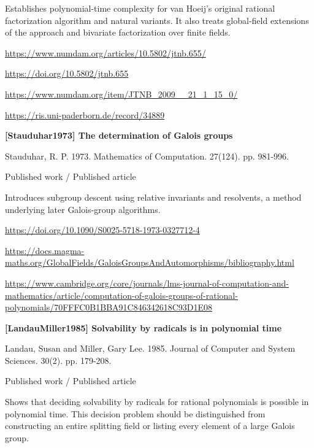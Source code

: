 \documentclass[11pt,a4paper,oneside,openany]{book}
\begin{document}
\color{black} Establishes polynomial-time complexity for van Hoeij's original rational factorization algorithm and natural variants. It also treats global-field extensions of the approach and bivariate factorization over finite fields.\par
{\footnotesize\url{https://www.numdam.org/articles/10.5802/jtnb.655/}}\par
{\footnotesize\url{https://doi.org/10.5802/jtnb.655}}\par
{\footnotesize\url{https://www.numdam.org/item/JTNB_2009__21_1_15_0/}}\par
{\footnotesize\url{https://ris.uni-paderborn.de/record/34889}}\par
\vspace{9pt}
\hypertarget{ref:Stauduhar1973}{}
{\sffamily\bfseries\color{atlasgreen}[Stauduhar1973] The determination of Galois groups}\par
\color{black} Stauduhar, R. P. 1973. Mathematics of Computation. 27(124). pp. 981-996.\par
{\small\sffamily\color{atlasgold}Published work / Published article}\par
\color{black} Introduces subgroup descent using relative invariants and resolvents, a method underlying later Galois-group algorithms.\par
{\footnotesize\url{https://doi.org/10.1090/S0025-5718-1973-0327712-4}}\par
{\footnotesize\url{https://docs.magma-maths.org/GlobalFields/GaloisGroupsAndAutomorphisms/bibliography.html}}\par
{\footnotesize\url{https://www.cambridge.org/core/journals/lms-journal-of-computation-and-mathematics/article/computation-of-galois-groups-of-rational-polynomials/70FFFC0B1BBA91C846342618C93D1E08}}\par
\vspace{9pt}
\hypertarget{ref:LandauMiller1985}{}
{\sffamily\bfseries\color{atlasgreen}[LandauMiller1985] Solvability by radicals is in polynomial time}\par
\color{black} Landau, Susan and Miller, Gary Lee. 1985. Journal of Computer and System Sciences. 30(2). pp. 179-208.\par
{\small\sffamily\color{atlasgold}Published work / Published article}\par
\color{black} Shows that deciding solvability by radicals for rational polynomials is possible in polynomial time. This decision problem should be distinguished from constructing an entire splitting field or listing every element of a large Galois group.\par
\end{document}
